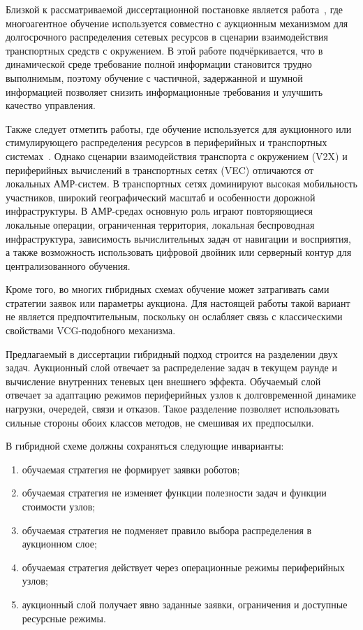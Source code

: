 Близкой к рассматриваемой диссертационной постановке является
работа~\cite{Tan2022MARLAuctionV2X}, где многоагентное обучение используется
совместно с аукционным механизмом для долгосрочного распределения сетевых
ресурсов в сценарии взаимодействия транспортных средств с окружением. В этой работе подчёркивается, что в
динамической среде требование полной информации становится трудно
выполнимым, поэтому обучение с частичной, задержанной и шумной информацией
позволяет снизить информационные требования и улучшить качество управления.

Также следует отметить работы, где обучение используется для аукционного или
стимулирующего распределения ресурсов в периферийных и транспортных
системах~\cite{Peng2024SlicingAuction,Liu2022AuctionMachineScheduling,Li2020RLBeliefAuction,Tong2024DRLIncentive,Hayla2025StackelbergMADRL}. Однако сценарии взаимодействия транспорта с окружением (V2X) и периферийных вычислений в транспортных сетях (VEC) отличаются от локальных АМР-систем. В транспортных сетях
доминируют высокая мобильность участников, широкий географический масштаб и
особенности дорожной инфраструктуры. В АМР-средах основную роль играют
повторяющиеся локальные операции, ограниченная территория, локальная
беспроводная инфраструктура, зависимость вычислительных задач от навигации и
восприятия, а также возможность использовать цифровой двойник или серверный
контур для централизованного обучения.

Кроме того, во многих гибридных схемах обучение может затрагивать сами
стратегии заявок или параметры аукциона. Для настоящей работы такой вариант
не является предпочтительным, поскольку он ослабляет связь с классическими
свойствами VCG-подобного механизма.

Предлагаемый в диссертации гибридный подход строится на разделении двух задач. Аукционный слой отвечает за распределение задач в текущем раунде и вычисление внутренних теневых цен внешнего эффекта. Обучаемый слой отвечает за адаптацию режимов периферийных узлов к долговременной динамике нагрузки, очередей, связи и отказов. Такое разделение позволяет использовать сильные стороны обоих классов методов, не смешивая их предпосылки.

В гибридной схеме должны сохраняться следующие инварианты:
\begin{enumerate}
    \item обучаемая стратегия не формирует заявки роботов;
    \item обучаемая стратегия не изменяет функции полезности задач и функции стоимости узлов;
    \item обучаемая стратегия не подменяет правило выбора распределения в аукционном слое;
    \item обучаемая стратегия действует через операционные режимы периферийных узлов;
    \item аукционный слой получает явно заданные заявки, ограничения и доступные ресурсные режимы.
\end{enumerate}

